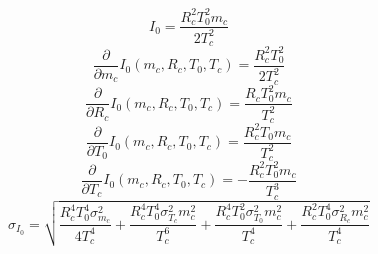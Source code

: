 \[\displaystyle I_{0} = \frac{R_{c}^{2} T_{0}^{2} m_{c}}{2 T_{c}^{2}}\]
\[\displaystyle \frac{\partial}{\partial m_{c}} I_{0}{\left(m_{c},R_{c},T_{0},T_{c} \right)} = \frac{R_{c}^{2} T_{0}^{2}}{2 T_{c}^{2}}\]
\[\displaystyle \frac{\partial}{\partial R_{c}} I_{0}{\left(m_{c},R_{c},T_{0},T_{c} \right)} = \frac{R_{c} T_{0}^{2} m_{c}}{T_{c}^{2}}\]
\[\displaystyle \frac{\partial}{\partial T_{0}} I_{0}{\left(m_{c},R_{c},T_{0},T_{c} \right)} = \frac{R_{c}^{2} T_{0} m_{c}}{T_{c}^{2}}\]
\[\displaystyle \frac{\partial}{\partial T_{c}} I_{0}{\left(m_{c},R_{c},T_{0},T_{c} \right)} = - \frac{R_{c}^{2} T_{0}^{2} m_{c}}{T_{c}^{3}}\]
\[\displaystyle \sigma_{I_{0}} = \sqrt{\frac{R_{c}^{4} T_{0}^{4} \sigma_{m_{c}}^{2}}{4 T_{c}^{4}} + \frac{R_{c}^{4} T_{0}^{4} \sigma_{T_{c}}^{2} m_{c}^{2}}{T_{c}^{6}} + \frac{R_{c}^{4} T_{0}^{2} \sigma_{T_{0}}^{2} m_{c}^{2}}{T_{c}^{4}} + \frac{R_{c}^{2} T_{0}^{4} \sigma_{R_{c}}^{2} m_{c}^{2}}{T_{c}^{4}}}\]

